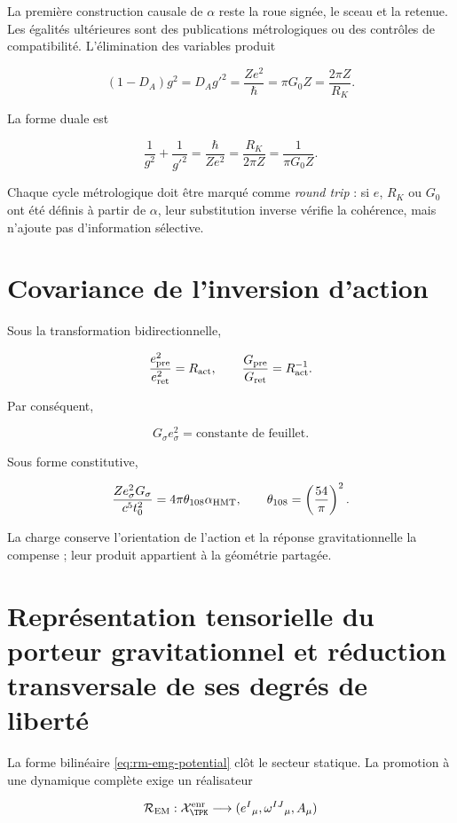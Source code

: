 La première construction causale de \(\alpha\) reste la roue signée,
le sceau et la retenue. Les égalités ultérieures sont des publications
métrologiques ou des contrôles de compatibilité. L'élimination des variables
produit

\[
(1-D_A)g^2=D_Ag'^2
=\frac{Ze^2}{\hbar}
=\pi G_0Z
=\frac{2\pi Z}{R_K}.
\]

La forme duale est

\[
\frac1{g^2}+\frac1{g'^2}
=\frac{\hbar}{Ze^2}
=\frac{R_K}{2\pi Z}
=\frac1{\pi G_0Z}.
\]

Chaque cycle métrologique doit être marqué comme \emph{round trip} : si \(e\),
\(R_K\) ou \(G_0\) ont été définis à partir de \(\alpha\), leur substitution inverse
vérifie la cohérence, mais n'ajoute pas d'information sélective.

\section{Covariance de l'inversion d'action}

Sous la transformation bidirectionnelle,

\[
\frac{e_{\rm pre}^2}{e_{\rm ret}^2}=R_{\rm act},
\qquad
\frac{G_{\rm pre}}{G_{\rm ret}}=R_{\rm act}^{-1}.
\]

Par conséquent,

\begin{equation}
\boxed{G_{\sigma}e_{\sigma}^2=\text{constante de feuillet}.}
\label{eq:rm-ge2-invariant}
\end{equation}

Sous forme constitutive,

\[
\frac{Ze_{\sigma}^2G_{\sigma}}
{c^5t_0^2}
=4\pi\theta_{108}\alpha_{\rm HMT},
\qquad
\theta_{108}=\left(\frac{54}{\pi}\right)^2.
\]

La charge conserve l'orientation de l'action et la réponse gravitationnelle
la compense ; leur produit appartient à la géométrie partagée.

\section{Représentation tensorielle du porteur gravitationnel et réduction transversale de ses degrés de liberté}

La forme bilinéaire \eqref{eq:rm-emg-potential} clôt le secteur statique. La
promotion à une dynamique complète exige un réalisateur

\[
\mathcal R_{\rm EM}:
\mathcal X_{\TPK}^{\rm enr}
\longrightarrow
(e^I{}_{\mu},\omega^{IJ}{}_{\mu},A_\mu)
\]


